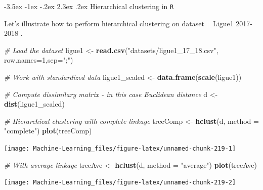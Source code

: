 \documentclass[]{book}
\makeatletter
\newenvironment{Shaded}{\begin{snugshade}}{\end{snugshade}}
\newcommand{\KeywordTok}[1]{\textcolor[rgb]{0.13,0.29,0.53}{\textbf{#1}}}
\newcommand{\DataTypeTok}[1]{\textcolor[rgb]{0.13,0.29,0.53}{#1}}
\newcommand{\DecValTok}[1]{\textcolor[rgb]{0.00,0.00,0.81}{#1}}
\newcommand{\StringTok}[1]{\textcolor[rgb]{0.31,0.60,0.02}{#1}}
\newcommand{\CommentTok}[1]{\textcolor[rgb]{0.56,0.35,0.01}{\textit{#1}}}
\newcommand{\NormalTok}[1]{#1}
\renewcommand\section{\@startsection {section}{1}{\z@}%
                                   {-3.5ex \@plus -1ex \@minus -.2ex}%
                                   {2.3ex \@plus.2ex}%
                                   {\normalfont\Large\bfseries\color{ForestGreen}}}
\theoremstyle{definition}
\theoremstyle{definition}
\theoremstyle{definition}
\theoremstyle{remark}
\makeatother
\begin{document}
\section{\texorpdfstring{Hierarchical clustering in
\texttt{R}}{Hierarchical clustering in R}}\label{hierarchical-clustering-in-r}

Let's illustrate how to perform hierarchical clustering on dataset
\textcolor{white}{[}\faTable\textcolor{white}{]} Ligue1 2017-2018 .

\begin{Shaded}
\begin{Highlighting}[]
\CommentTok{# Load the dataset}
\NormalTok{ligue1 <-}\StringTok{ }\KeywordTok{read.csv}\NormalTok{(}\StringTok{"datasets/ligue1_17_18.csv"}\NormalTok{, }\DataTypeTok{row.names=}\DecValTok{1}\NormalTok{,}\DataTypeTok{sep=}\StringTok{";"}\NormalTok{)}

\CommentTok{# Work with standardized data}
\NormalTok{ligue1_scaled <-}\StringTok{ }\KeywordTok{data.frame}\NormalTok{(}\KeywordTok{scale}\NormalTok{(ligue1))}

\CommentTok{# Compute dissimilary matrix - in this case Euclidean distance}
\NormalTok{d <-}\StringTok{ }\KeywordTok{dist}\NormalTok{(ligue1_scaled)}

\CommentTok{# Hierarchical clustering with complete linkage}
\NormalTok{treeComp <-}\StringTok{ }\KeywordTok{hclust}\NormalTok{(d, }\DataTypeTok{method =} \StringTok{"complete"}\NormalTok{)}
\KeywordTok{plot}\NormalTok{(treeComp)}
\end{Highlighting}
\end{Shaded}

\begin{center}\texttt{[image: Machine-Learning\_files/figure-latex/unnamed-chunk-219-1]} \end{center}

\begin{Shaded}
\begin{Highlighting}[]

\CommentTok{# With average linkage}
\NormalTok{treeAve <-}\StringTok{ }\KeywordTok{hclust}\NormalTok{(d, }\DataTypeTok{method =} \StringTok{"average"}\NormalTok{)}
\KeywordTok{plot}\NormalTok{(treeAve)}
\end{Highlighting}
\end{Shaded}

\begin{center}\texttt{[image: Machine-Learning\_files/figure-latex/unnamed-chunk-219-2]} \end{center}
\end{document}
